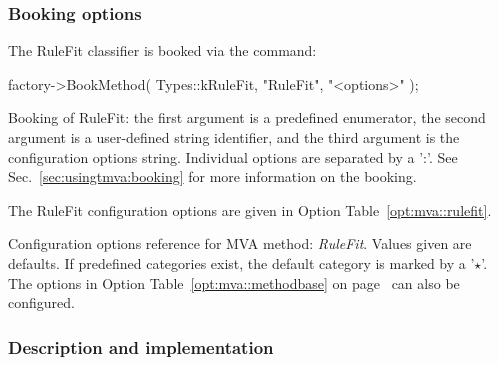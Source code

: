 \subsubsection{Booking options}

The RuleFit classifier is booked via the command:
\begin{codeexample}
\begin{tmvacode}
factory->BookMethod( Types::kRuleFit, "RuleFit", "<options>" );
\end{tmvacode}
\caption[.]{\codeexampleCaptionSize Booking of RuleFit: the first argument is a
            predefined enumerator, the second argument is a 
            user-defined string identifier, and the third argument is the 
            configuration options string. Individual options are separated by a ':'. 
            See Sec.~\ref{sec:usingtmva:booking} for more information on the booking.}
\end{codeexample}
The RuleFit configuration options are given in Option 
Table~\ref{opt:mva::rulefit}.

\begin{option}[!t]

\caption[.]{\optionCaptionSize 
     Configuration options reference for MVA method: {\em RuleFit}.
     Values given are defaults. If predefined categories exist, the default category 
     is marked by a '$\star$'. The options in Option Table~\ref{opt:mva::methodbase} on 
     page~\pageref{opt:mva::methodbase} can also be configured.     
}
\label{opt:mva::rulefit}
\end{option}

\subsubsection{Description and implementation}
\label{sec:RuleFitDescript}

